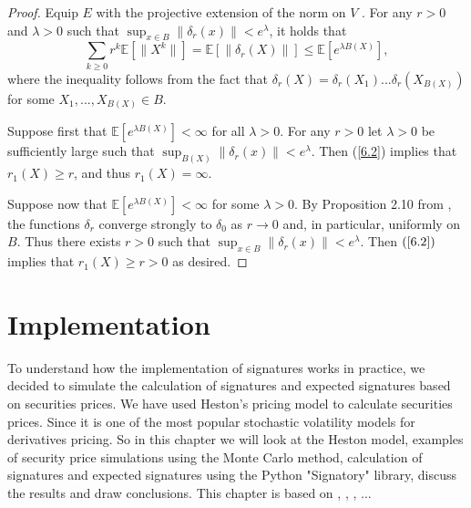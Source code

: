 \documentclass[12pt,a4paper]{report}
\theoremstyle{definition}
\begin{document}
\begin{proof} 
	
	Equip $E$ with the projective extension of the norm on $V$ . For any $r > 0$ and $\lambda > 0$ such that $\sup_{x\in B} \lVert \delta_r(x)\rVert < e^\lambda$, it holds that
	\begin{equation} \label{6.2}
		\sum_{k\geq 0}r^k\mathbb{E}[\lVert X^k\rVert]=\mathbb{E}[\lVert\delta_r(X)\rVert]\leq \mathbb{E}[e^{\lambda B(X)}],
	\end{equation}
	where the inequality follows from the fact that $\delta_r(X) = \delta _r(X_1). . . \delta_r(X_{B(X)})$ for 	some $X_1, . . . , X_{B(X)} \in B$.
	
	Suppose first that $\mathbb{E}[e^{\lambda B(X)}]< \infty$ for all $\lambda > 0$. For any $r > 0$ let $\lambda > 0$ be sufficiently large such that $\sup_{B(X)} \lVert \delta_r(x)\rVert < e^\lambda$. Then (\ref{6.2}) implies that $r_1(X) \geq r$,	and thus $r_1(X) = \infty$.
	
	
	Suppose now that $\mathbb{E}[e^{\lambda B(X)}]< \infty$ for some $\lambda > 0$. By Proposition 2.10 from \parencite{chevyrev2016characteristic}, the functions $\delta_r$ converge strongly to $\delta_0$ as $r \rightarrow 0$ and, in particular, uniformly on $B$. Thus there exists $r > 0$ such that $\sup _{x\in B} \lVert \delta_r(x)\rVert < e^\lambda$. Then $(\ref{6.2})$ implies that	$r_1(X) \geq r > 0$ as desired.
	
\end{proof}





\chapter{Implementation}

To understand how the implementation of signatures works in practice, we decided to simulate the calculation of signatures and expected signatures based on securities prices. We have used Heston's pricing model to calculate securities prices. Since it is one of the most popular stochastic volatility models for derivatives pricing.
So in this chapter we will look at the Heston model, examples of security price simulations using the Monte Carlo method, calculation of signatures and expected signatures using the Python "Signatory" library, discuss the results and draw conclusions. This chapter is based on \parencite{gauthier2009fitting}, \parencite{heston1993closed},  \parencite{moodley2005heston}, \parencite{kidger2020signatory}...
\end{document}
